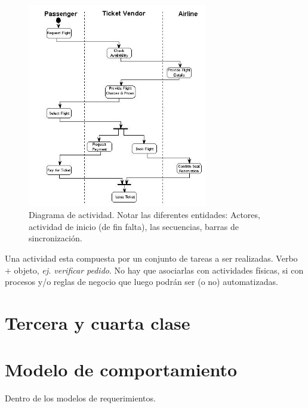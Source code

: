 \documentclass[titlepage,a4paper]{article}
\begin{document}
    \begin{figure}[!htb]
        \centering
        \includegraphics[width=0.7\textwidth]{Imagenes/DiagramaActividad.png}
        \caption{Diagrama de actividad. Notar las diferentes entidades: Actores, actividad de inicio (de fin falta), las secuencias, barras de sincronización.}
    \end{figure}

Una actividad esta compuesta por un conjunto de tareas a ser realizadas. Verbo $+$ objeto, \textit{ej. verificar pedido}. No hay que asociarlas con actividades físicas, si con procesos y/o reglas de negocio que luego podrán ser (o no) automatizadas.


\newpage
\section*{Tercera y cuarta clase}

\section{Modelo de comportamiento}
Dentro de los modelos de requerimientos.
\end{document}
